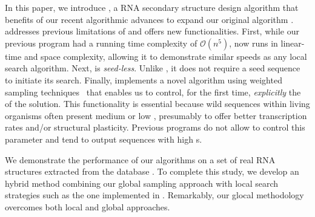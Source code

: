 In this paper, we introduce \ourprog, a RNA secondary structure design algorithm that benefits of our recent algorithmic advances \cite{Reinharz:2013aa} to expand our original \RNAensign algorithm \cite{Levin:2012kx}. \ourprog addresses previous limitations of \RNAensign and offers new functionalities. First, while our previous program had a running time complexity of $\mathcal{O}(n^5)$, \ourprog now runs in linear-time and space complexity, allowing it to demonstrate similar speeds as any local search algorithm. Next, \ourprog is \textit{seed-less}. Unlike \RNAensign, it does not require a seed sequence to initiate its search. Finally, \ourprog implements a novel algorithm using weighted sampling techniques~\cite{Bodini2010} that enables us to control, for the first time, \textit{explicitly} the \GCContent of the solution. This functionality is essential because wild sequences within living organisms often present medium or low \GCContent, presumably to offer better transcription rates and/or structural plasticity. Previous programs do not allow to control this parameter and tend to output sequences with high \GCContent{}s. 

We demonstrate the performance of our algorithms on a set of real RNA structures extracted from the \RNASTRAND database \cite{andronescu2008rna}. To complete this study, we develop an hybrid method combining our global sampling approach with local search strategies such as the one implemented in \RNAinverse. Remarkably, our glocal methodology overcomes both local and global approaches.